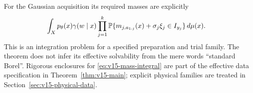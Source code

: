 For the Gaussian acquisition its required masses are explicitly
\begin{equation}\label{eq:v15-mass-integral}
 \int_X p_\theta(x)\gamma(w\mid x)
       \prod_{j=1}^k
       \mathbb P\{m_{j,a_{1:j}}(x)+\sigma_j\xi_j\in I_{y_j}\}\,d\mu(x).
\end{equation}
This is an integration problem for a specified preparation and trial
family. The theorem does not infer its effective solvability from the
mere words ``standard Borel''. Rigorous enclosures for
\eqref{eq:v15-mass-integral} are part of the effective data specification
in Theorem~\ref{thm:v15-main}; explicit physical families are treated in
Section~\ref{sec:v15-physical-data}.
